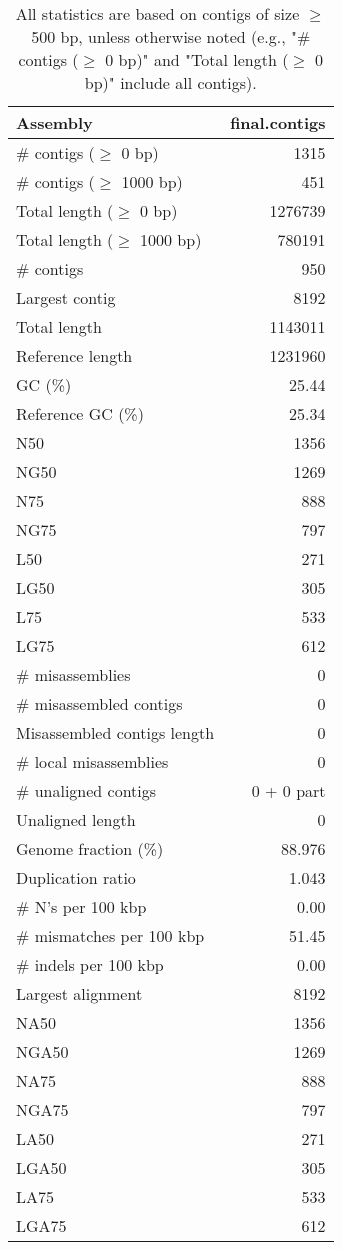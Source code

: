 \documentclass[12pt,a4paper]{article}
\begin{document}
\begin{table}[ht]
\begin{center}
\caption{All statistics are based on contigs of size $\geq$ 500 bp, unless otherwise noted (e.g., "\# contigs ($\geq$ 0 bp)" and "Total length ($\geq$ 0 bp)" include all contigs).}
\begin{tabular}{|l*{1}{|r}|}
\hline
Assembly & final.contigs \\ \hline
\# contigs ($\geq$ 0 bp) & 1315 \\ \hline
\# contigs ($\geq$ 1000 bp) & 451 \\ \hline
Total length ($\geq$ 0 bp) & 1276739 \\ \hline
Total length ($\geq$ 1000 bp) & 780191 \\ \hline
\# contigs & 950 \\ \hline
Largest contig & 8192 \\ \hline
Total length & 1143011 \\ \hline
Reference length & 1231960 \\ \hline
GC (\%) & 25.44 \\ \hline
Reference GC (\%) & 25.34 \\ \hline
N50 & 1356 \\ \hline
NG50 & 1269 \\ \hline
N75 & 888 \\ \hline
NG75 & 797 \\ \hline
L50 & 271 \\ \hline
LG50 & 305 \\ \hline
L75 & 533 \\ \hline
LG75 & 612 \\ \hline
\# misassemblies & 0 \\ \hline
\# misassembled contigs & 0 \\ \hline
Misassembled contigs length & 0 \\ \hline
\# local misassemblies & 0 \\ \hline
\# unaligned contigs & 0 + 0 part \\ \hline
Unaligned length & 0 \\ \hline
Genome fraction (\%) & 88.976 \\ \hline
Duplication ratio & 1.043 \\ \hline
\# N's per 100 kbp & 0.00 \\ \hline
\# mismatches per 100 kbp & 51.45 \\ \hline
\# indels per 100 kbp & 0.00 \\ \hline
Largest alignment & 8192 \\ \hline
NA50 & 1356 \\ \hline
NGA50 & 1269 \\ \hline
NA75 & 888 \\ \hline
NGA75 & 797 \\ \hline
LA50 & 271 \\ \hline
LGA50 & 305 \\ \hline
LA75 & 533 \\ \hline
LGA75 & 612 \\ \hline
\end{tabular}
\end{center}
\end{table}
\end{document}
